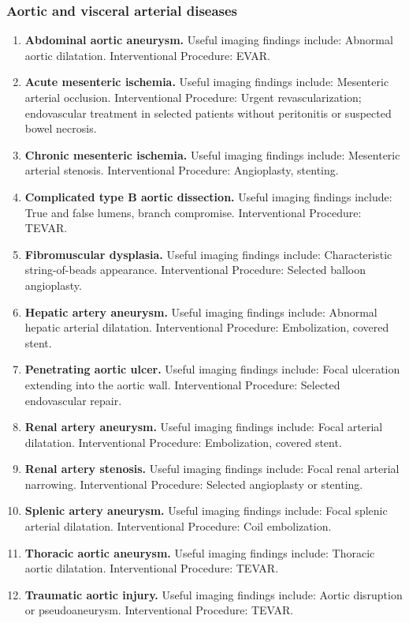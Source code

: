\subsubsection{Aortic and visceral arterial diseases}
\begin{enumerate}[leftmargin=*,itemsep=0.45em,topsep=0.4em]
\item \textbf{Abdominal aortic aneurysm.} Useful imaging findings include: Abnormal aortic dilatation. Interventional Procedure: EVAR.
\item \textbf{Acute mesenteric ischemia.} Useful imaging findings include: Mesenteric arterial occlusion. Interventional Procedure: Urgent revascularization; endovascular treatment in selected patients without peritonitis or suspected bowel necrosis.
\item \textbf{Chronic mesenteric ischemia.} Useful imaging findings include: Mesenteric arterial stenosis. Interventional Procedure: Angioplasty, stenting.
\item \textbf{Complicated type B aortic dissection.} Useful imaging findings include: True and false lumens, branch compromise. Interventional Procedure: TEVAR.
\item \textbf{Fibromuscular dysplasia.} Useful imaging findings include: Characteristic string-of-beads appearance. Interventional Procedure: Selected balloon angioplasty.
\item \textbf{Hepatic artery aneurysm.} Useful imaging findings include: Abnormal hepatic arterial dilatation. Interventional Procedure: Embolization, covered stent.
\item \textbf{Penetrating aortic ulcer.} Useful imaging findings include: Focal ulceration extending into the aortic wall. Interventional Procedure: Selected endovascular repair.
\item \textbf{Renal artery aneurysm.} Useful imaging findings include: Focal arterial dilatation. Interventional Procedure: Embolization, covered stent.
\item \textbf{Renal artery stenosis.} Useful imaging findings include: Focal renal arterial narrowing. Interventional Procedure: Selected angioplasty or stenting.
\item \textbf{Splenic artery aneurysm.} Useful imaging findings include: Focal splenic arterial dilatation. Interventional Procedure: Coil embolization.
\item \textbf{Thoracic aortic aneurysm.} Useful imaging findings include: Thoracic aortic dilatation. Interventional Procedure: TEVAR.
\item \textbf{Traumatic aortic injury.} Useful imaging findings include: Aortic disruption or pseudoaneurysm. Interventional Procedure: TEVAR.

\end{enumerate}
